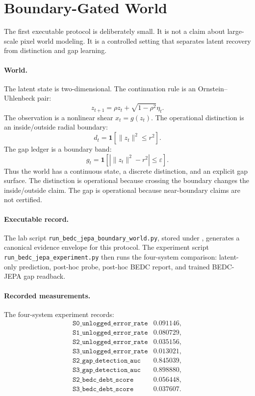 \section{Boundary-Gated World}
\label{sec:boundary-gated-world}

The first executable protocol is deliberately small.  It is not a claim about
large-scale pixel world modeling.  It is a controlled setting that separates
latent recovery from distinction and gap learning.

\paragraph{World.}
The latent state is two-dimensional.  The continuation rule is an
Ornstein--Uhlenbeck pair:
$$
  z_{t+1}=\rho z_t+\sqrt{1-\rho^2}\eta_t .
$$
The observation is a nonlinear shear $x_t=g(z_t)$.  The operational
distinction is an inside/outside radial boundary:
$$
  d_t = \mathbf 1[\lVert z_t\rVert^2\le r^2].
$$
The gap ledger is a boundary band:
$$
  g_t = \mathbf 1[|\lVert z_t\rVert^2-r^2|\le \varepsilon].
$$
Thus the world has a continuous state, a discrete distinction, and an explicit
gap surface.  The distinction is operational because crossing the boundary
changes the inside/outside claim.  The gap is operational because near-boundary
claims are not certified.

\paragraph{Executable record.}
The lab script \texttt{run\_bedc\_jepa\_boundary\_world.py}, stored under
, generates a canonical evidence
envelope for this protocol.  The experiment script
\texttt{run\_bedc\_jepa\_experiment.py} then runs the four-system comparison:
latent-only prediction, post-hoc probe, post-hoc BEDC report, and trained
BEDC-JEPA gap readback.

\paragraph{Recorded measurements.}
The four-system experiment records:
$$
\begin{array}{ll}
\texttt{S0\_unlogged\_error\_rate} & 0.091146,\\
\texttt{S1\_unlogged\_error\_rate} & 0.080729,\\
\texttt{S2\_unlogged\_error\_rate} & 0.035156,\\
\texttt{S3\_unlogged\_error\_rate} & 0.013021,\\
\texttt{S2\_gap\_detection\_auc} & 0.845039,\\
\texttt{S3\_gap\_detection\_auc} & 0.898880,\\
\texttt{S2\_bedc\_debt\_score} & 0.056448,\\
\texttt{S3\_bedc\_debt\_score} & 0.037607.
\end{array}
$$

